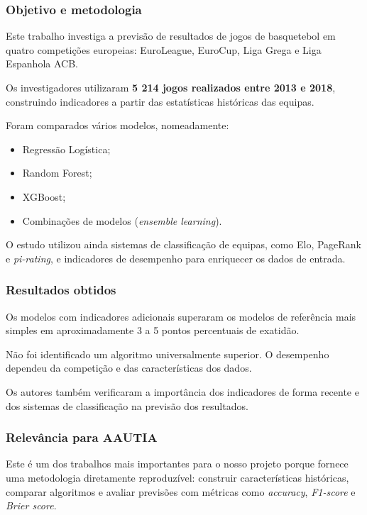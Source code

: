 \subsubsection{Objetivo e metodologia}\label{aautia:objetivo-e-metodologia}

Este trabalho investiga a previsão de resultados de jogos de basquetebol em quatro competições europeias: EuroLeague, EuroCup, Liga Grega e Liga Espanhola ACB.

Os investigadores utilizaram \textbf{5 214 jogos realizados entre 2013 e 2018}, construindo indicadores a partir das estatísticas históricas das equipas.

Foram comparados vários modelos, nomeadamente:

\begin{itemize}
\tightlist
\item
  Regressão Logística;
\item
  Random Forest;
\item
  XGBoost;
\item
  Combinações de modelos (\emph{ensemble learning}).
\end{itemize}

O estudo utilizou ainda sistemas de classificação de equipas, como Elo, PageRank e \emph{pi-rating}, e indicadores de desempenho para enriquecer os dados de entrada.

\subsubsection{Resultados obtidos}\label{aautia:resultados-obtidos}

Os modelos com indicadores adicionais superaram os modelos de referência mais simples em aproximadamente 3 a 5 pontos percentuais de exatidão.

Não foi identificado um algoritmo universalmente superior. O desempenho dependeu da competição e das características dos dados.

Os autores também verificaram a importância dos indicadores de forma recente e dos sistemas de classificação na previsão dos resultados.

\subsubsection{Relevância para AAUTIA}\label{aautia:relevuxe2ncia-para-aautia}

Este é um dos trabalhos mais importantes para o nosso projeto porque fornece uma metodologia diretamente reproduzível: construir características históricas, comparar algoritmos e avaliar previsões com métricas como \emph{accuracy}, \emph{F1-score} e \emph{Brier score}.

